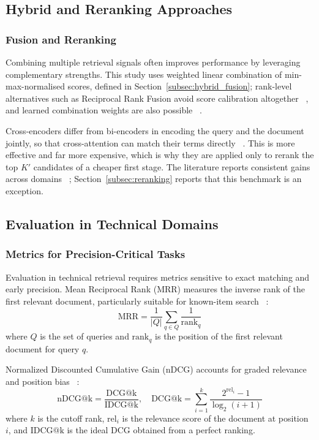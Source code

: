 \documentclass[preprint,12pt]{elsarticle}
\begin{document}
\subsection{Hybrid and Reranking Approaches}

\subsubsection{Fusion and Reranking}

Combining multiple retrieval signals often improves performance by leveraging complementary strengths. This study uses weighted linear combination of min-max-normalised scores, defined in Section~\ref{subsec:hybrid_fusion}; rank-level alternatives such as Reciprocal Rank Fusion avoid score calibration altogether ~\cite{cormack2009reciprocal, lin2021pretrained}, and learned combination weights are also possible ~\cite{macdonald2013learning}.

Cross-encoders differ from bi-encoders in encoding the query and the document jointly, so that cross-attention can match their terms directly ~\cite{nogueira2020passage}. This is more effective and far more expensive, which is why they are applied only to rerank the top $K'$ candidates of a cheaper first stage. The literature reports consistent gains across domains ~\cite{zhuang2023rankt5}; Section~\ref{subsec:reranking} reports that this benchmark is an exception.

\subsection{Evaluation in Technical Domains}

\subsubsection{Metrics for Precision-Critical Tasks}

Evaluation in technical retrieval requires metrics sensitive to exact matching and early precision. Mean Reciprocal Rank (MRR) measures the inverse rank of the first relevant document, particularly suitable for known-item search ~\cite{craswell2009mean}:
\begin{equation}
\text{MRR} = \frac{1}{|Q|} \sum_{q \in Q} \frac{1}{\text{rank}_q}
\end{equation}
where $Q$ is the set of queries and $\text{rank}_q$ is the position of the first relevant document for query $q$.

Normalized Discounted Cumulative Gain (nDCG) accounts for graded relevance and position bias ~\cite{jarvelin2002cumulated}:
\begin{equation}
\text{nDCG@k} = \frac{\text{DCG@k}}{\text{IDCG@k}}, \quad \text{DCG@k} = \sum_{i=1}^k \frac{2^{\text{rel}_i} - 1}{\log_2(i+1)}
\end{equation}
where $k$ is the cutoff rank, $\text{rel}_i$ is the relevance score of the document at position $i$, and $\text{IDCG@k}$ is the ideal DCG obtained from a perfect ranking.
\end{document}
